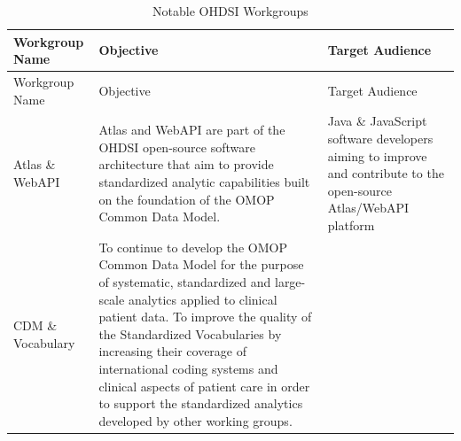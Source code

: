 \documentclass[11pt]{book}
\theoremstyle{definition}
\theoremstyle{definition}
\theoremstyle{definition}
\theoremstyle{remark}
\begin{document}
\begin{longtable}[]{@{}lll@{}}
\caption{\label{tab:OHDSIworkgroups} Notable OHDSI Workgroups}\tabularnewline
\toprule
\begin{minipage}[b]{0.13\columnwidth}\raggedright
Workgroup Name\strut
\end{minipage} & \begin{minipage}[b]{0.51\columnwidth}\raggedright
Objective\strut
\end{minipage} & \begin{minipage}[b]{0.27\columnwidth}\raggedright
Target Audience\strut
\end{minipage}\tabularnewline
\midrule
\endfirsthead
\toprule
\begin{minipage}[b]{0.13\columnwidth}\raggedright
Workgroup Name\strut
\end{minipage} & \begin{minipage}[b]{0.51\columnwidth}\raggedright
Objective\strut
\end{minipage} & \begin{minipage}[b]{0.27\columnwidth}\raggedright
Target Audience\strut
\end{minipage}\tabularnewline
\midrule
\endhead
\begin{minipage}[t]{0.13\columnwidth}\raggedright
Atlas \& WebAPI\strut
\end{minipage} & \begin{minipage}[t]{0.51\columnwidth}\raggedright
Atlas and WebAPI are part of the OHDSI open-source software architecture that aim to provide standardized analytic capabilities built on the foundation of the OMOP Common Data Model.\strut
\end{minipage} & \begin{minipage}[t]{0.27\columnwidth}\raggedright
Java \& JavaScript software developers aiming to improve and contribute to the open-source Atlas/WebAPI platform\strut
\end{minipage}\tabularnewline
\begin{minipage}[t]{0.13\columnwidth}\raggedright
CDM \& Vocabulary\strut
\end{minipage} & \begin{minipage}[t]{0.51\columnwidth}\raggedright
To continue to develop the OMOP Common Data Model for the purpose of systematic, standardized and large-scale analytics applied to clinical patient data. To improve the quality of the Standardized Vocabularies by increasing their coverage of international coding systems and clinical aspects of patient care in order to support the standardized analytics developed by other working groups.\strut

\end{minipage}
\end{longtable}
\end{document}
